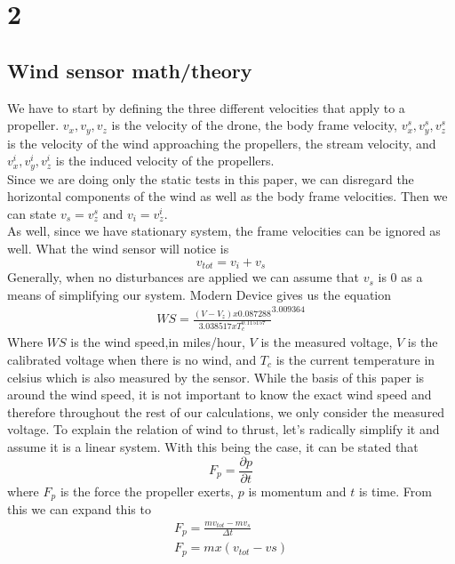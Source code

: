 \documentclass[conference]{IEEEtran}
\begin{document}
\section{2}
\subsection{Wind sensor math/theory}
We have to start by defining the three different velocities that apply to a propeller.
$v_x , v_y , v_z$ is the velocity of the drone, the body frame velocity, $v^s_{x} , v^s_{y} , v^s_{z}$ is the velocity of the wind approaching the propellers, the stream velocity, and $ v^i_{x} , v^i_{y} , v^i_{z}$ is the induced velocity of the propellers.\\
Since we are doing only the static tests in this paper, we can disregard the horizontal components of the wind as well as the body frame velocities. Then we can state $v_s = v^s_{z}$ and $ v_i = v^i_{z} $.\\
As well, since we have stationary system, the frame velocities can be ignored as well. What the wind sensor will notice is 
\begin{equation}
v_{tot} = v_{i} + v_{s}
\label{vtot}
\end{equation}	
Generally, when no disturbances are applied we can assume that $v_s$ is $0$ as a means of simplifying our system.
Modern Device \cite{md} gives us the equation 
\begin{eqnarray}
WS = \frac{(V - V_{z})x0.087288}{3.038517 x T_{c} ^{0.115157}} ^ {3.009364}
\label{wind_speed}
\end{eqnarray}
Where $WS$ is the wind speed,in miles/hour, $V$ is the measured voltage, $V$ is the calibrated voltage when there is no wind, and $T_c$ is the current temperature in celsius which is also measured by the sensor. While the basis of this paper is around the wind speed, it is not important to know the exact wind speed and therefore throughout the rest of our calculations, we only consider the measured voltage. 
To explain the relation of wind to thrust, let's radically simplify it and assume it is a linear system.  With this being the case, it can be stated that 
\begin{equation}
F_p= \frac{\partial p}{\partial t}
\label{fvm}
\end{equation}
where $F_p$ is the force the propeller exerts, $p$ is momentum and $t$ is time. From this we can expand this to 
\begin{eqnarray}
F_p= \frac{mv_{tot} - mv_{s}}{\Delta t}\\ 
\label{fvm2}
F_p= mx(v_{tot}-v{s}) 
\label{fvm3}
\end{eqnarray}
\end{document}
